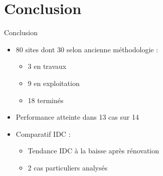 \documentclass{beamer}
\begin{document}
\section{Conclusion}
\begin{frame}[t]{Conclusion}
    \vspace{4pt}
    \begin{itemize}
        \setlength{\itemsep}{0.5em}
        \item 80 sites dont 30 selon ancienne méthodologie :
        \begin{itemize}
            \setlength{\itemsep}{0.2em}
            \item 3 en travaux
            \item 9 en exploitation
            \item 18 terminés
        \end{itemize}
        \item Performance atteinte dans 13 cas sur 14
        \item Comparatif IDC :
        \begin{itemize}
            \setlength{\itemsep}{0.2em}
            \item Tendance IDC à la baisse après rénovation
            \item 2 cas particuliers analysés
        \end{itemize}
    \end{itemize}
\end{frame}
\end{document}
